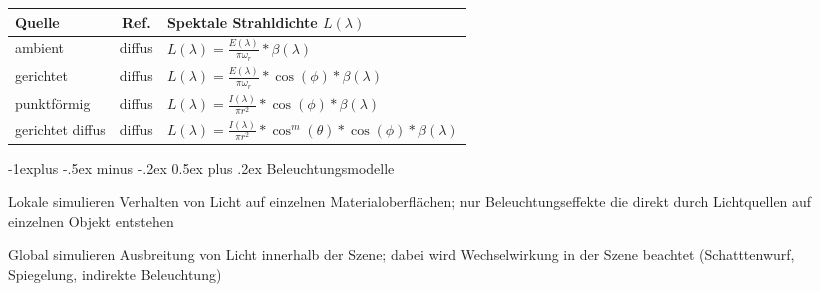 \documentclass[landscape]{article}
\makeatletter
\renewcommand{\subsection}{\@startsection{subsection}{2}{0mm}%
                                {-1explus -.5ex minus -.2ex}%
                                {0.5ex plus .2ex}%
                                {\normalfont\normalsize\bfseries}}
\makeatother
\begin{document}
\begin{multicols}{3}
  \begin{tabular}{l | c | l}
    Quelle           & Ref.   & Spektale Strahldichte $L(\lambda)$                                                 \\\hline
    ambient          & diffus & $L(\lambda)=\frac{E(\lambda)}{\pi\omega_r}*\beta(\lambda)$                         \\
    gerichtet        & diffus & $L(\lambda)=\frac{E(\lambda)}{\pi\omega_r}*\cos(\phi)*\beta(\lambda)$              \\
    punktförmig      & diffus & $L(\lambda) = \frac{I(\lambda)}{\pi r^2 }*\cos(\phi)*\beta(\lambda)$               \\
    gerichtet diffus & diffus & $L(\lambda)=\frac{I(\lambda)}{\pi r^2 }* \cos^m(\theta)*\cos(\phi)*\beta(\lambda)$ \\
  \end{tabular}
  
  \subsection{Beleuchtungsmodelle}
  \begin{description*}
    \item[Lokale] simulieren Verhalten von Licht auf einzelnen Materialoberflächen; nur Beleuchtungseffekte die direkt durch Lichtquellen auf einzelnen Objekt entstehen
    \item[Global] simulieren Ausbreitung von Licht innerhalb der Szene; dabei wird Wechselwirkung in der Szene beachtet (Schatttenwurf, Spiegelung, indirekte Beleuchtung)
  \end{description*}
  

\end{multicols}
\end{document}
